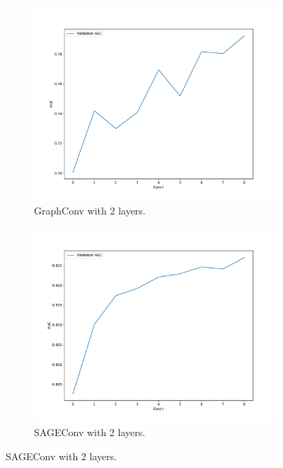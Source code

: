 \documentclass[11pt]{article}
\begin{document}
\begin{figure}
  \centering
  \begin{subfigure}{0.49\textwidth}
      \centering
      \includegraphics[width=\textwidth]{figures/charts/Graph/auc-layerType_GraphConv-numLayers_2.pdf}
      \caption{GraphConv with 2 layers.}
      \label{fig:graph2}
  \end{subfigure}
  \begin{subfigure}{0.49\textwidth}
    \centering
    \includegraphics[width=\textwidth]{figures/charts/Sage/auc-layerType_SAGEConv-numLayers_2.pdf}
    \caption{SAGEConv with 2 layers.}
    \label{fig:sage2}

\end{subfigure}
\end{figure}
\end{document}
